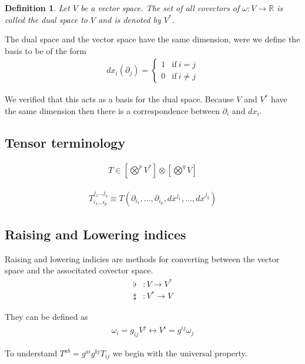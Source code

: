 \documentclass[12pt]{armath}
\newtheorem{definition}{Definition}[section]
\newcommand{\ra}{\rightarrow}
\newcommand{\R}{\mathbb{R}}
\begin{document}
  \begin{definition}
    Let $V$ be a vector space. The set of all covectors of $\omega:V\ra\R$ is
    called the dual space to $V$ and is denoted by $V^*$.
  \end{definition}

  The dual space and the vector space have the same dimension, were we define the
  basis to be of the form
  \begin{align*}
    dx_i(\partial_j)=\begin{cases}1 & \text{if}\ i=j\\
    0 & \text{if}\ i\neq j\end{cases}
  \end{align*}

  We verified that this acts as a basis for the dual space. Because $V$ and $V^*$
  have the same dimension then there is a correspondence between $\partial_i$ and
  $dx_i$.

  \subsection{Tensor terminology}%
  \label{sub:tensor_terminology}
  \begin{align*}
    T\in\left[\bigotimes^p V^*\right]\otimes\left[\bigotimes^q V\right]
  \end{align*}

  \begin{align*}
    T_{i_1\ldots i_p}^{j_1\ldots j_q}\equiv
    T(\partial_{i_1},\ldots,\partial_{i_p},dx^{j_1},\ldots,dx^{j_q})
  \end{align*}

  \subsection{Raising and Lowering indices}%
  \label{sub:raising_and_lowering_indices}

  Raising and lowering indicies are methods for converting between the vector
  space and the associtated covector space.
  \begin{align*}
    \flat&:V\ra V^*\\
    \sharp&:V^*\ra V
  \end{align*}

  They can be defined as
  \begin{align*}
    \omega_i=g_{ij}V^j\leftrightarrow V^i=g^{ij}\omega_j
  \end{align*}

  To understand $T^{ab}=g^{ai}g^{bj}T_{ij}$ we begin with the universal
  property.
\end{document}

